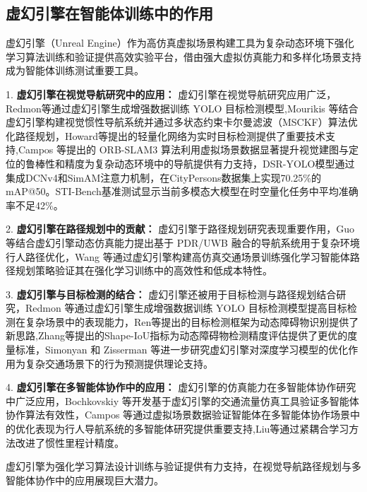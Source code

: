 \subsection{虚幻引擎在智能体训练中的作用}

虚幻引擎（Unreal Engine）作为高仿真虚拟场景构建工具为复杂动态环境下强化学习算法训练和验证提供高效实验平台，借由强大虚拟仿真能力和多样化场景支持成为智能体训练测试重要工具。

1. \textbf{虚幻引擎在视觉导航研究中的应用：} 虚幻引擎在视觉导航研究应用广泛，Redmon等\cite{redmon2017yolo9000}通过虚幻引擎生成增强数据训练 YOLO 目标检测模型,Mourikis 等\cite{mourikis2007msckf}结合虚幻引擎构建视觉惯性导航系统并通过多状态约束卡尔曼滤波（MSCKF）算法优化路径规划，Howard等\cite{howard2017mobilenets}提出的轻量化网络为实时目标检测提供了重要技术支持,Campos 等\cite{campos2021orbslam3}提出的 ORB-SLAM3 算法利用虚拟场景数据显著提升视觉建图与定位的鲁棒性和精度为复杂动态环境中的导航提供有力支持，DSR-YOLO模型\cite{dsryolo2025}通过集成DCNv4和SimAM注意力机制，在CityPersons数据集上实现70.25\%的mAP@50。STI-Bench基准测试\cite{sti2025}显示当前多模态大模型在时空量化任务中平均准确率不足42\%。

2. \textbf{虚幻引擎在路径规划中的贡献：} 虚幻引擎于路径规划研究表现重要作用，Guo 等\cite{guo2020pdr}结合虚幻引擎动态仿真能力提出基于 PDR/UWB 融合的导航系统用于复杂环境行人路径优化，Wang 等\cite{wang2023llio}通过虚幻引擎构建高仿真交通场景训练强化学习智能体路径规划策略验证其在强化学习训练中的高效性和低成本特性。

3. \textbf{虚幻引擎与目标检测的结合：} 虚幻引擎还被用于目标检测与路径规划结合研究，Redmon 等\cite{redmon2017yolo9000}通过虚幻引擎生成增强数据训练 YOLO 目标检测模型提高目标检测在复杂场景中的表现能力，Ren等\cite{ren2017fasterrcnn}提出的目标检测框架为动态障碍物识别提供了新思路,Zhang等\cite{zhang2023shapeiou}提出的Shape-IoU指标为动态障碍物检测精度评估提供了更优的度量标准，Simonyan 和 Zisserman 等\cite{simonyan2014action}进一步研究虚幻引擎对深度学习模型的优化作用为复杂交通场景下的行为预测提供理论支持。 

4. \textbf{虚幻引擎在多智能体协作中的应用：} 虚幻引擎的仿真能力在多智能体协作研究中广泛应用，Bochkovskiy 等\cite{bochkovskiy2020yolov4}开发基于虚幻引擎的交通流量仿真工具验证多智能体协作算法有效性，Campos 等\cite{campos2021orbslam3}通过虚拟场景数据验证智能体在多智能体协作场景中的优化表现为行人导航系统的多智能体研究提供重要支持,Liu等\cite{liu2020tlio}通过紧耦合学习方法改进了惯性里程计精度。

虚幻引擎为强化学习算法设计训练与验证提供有力支持，在视觉导航路径规划与多智能体协作中的应用展现巨大潜力。

